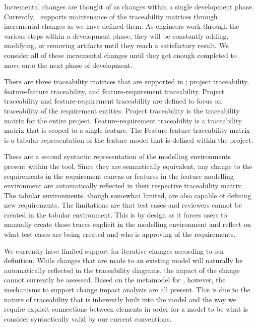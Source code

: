 Incremental changes are thought of as changes within a single development phase. Currently, \tool\ supports maintenance of the traceability matrices through incremental changes as we have defined them. As engineers work through the various steps within a development phase, they will be constantly adding, modifying, or removing artifacts until they reach a satisfactory result. We consider all of these incremental changes until they get enough completed to move onto the next phase of development.

There are three traceability matrices that are supported in \tool; project traceability, feature-feature traceability, and feature-requirement traceability. Project traceability and feature-requirement traceability are defined to focus on traceability of the requirement entities. Project traceability is the traceability matrix for the entire project. Feature-requirement traceability is a traceability matrix that is scoped to a single feature. The Feature-feature traceability matrix is a tabular representation of the feature model that is defined within the project.

These are a second syntactic representation of the modelling environments present within the tool. Since they are semantically equivalent, any change to the requirements in the requirement canvas or features in the feature modelling environment are automatically reflected in their respective traceability matrix. The tabular environments, though somewhat limited, are also capable of defining new requirements. The limitations are that test cases and reviewers cannot be created in the tabular environment. This is by design as it forces users to manually create those traces explicit in the modelling environment and reflect on what test cases are being created and who is approving of the requirements.

We currently have limited support for iterative changes according to our definition. While changes that are made to an existing model will naturally be automatically reflected in the traceability diagrams, the impact of the change cannot currently be assessed. Based on the metamodel for \tool, however, the mechanisms to support change impact analysis are all present. This is due to the nature of traceability that is inherently built into the model and the way we require explicit connections between elements in order for a model to be what is consider syntactically valid by our current conventions. 





